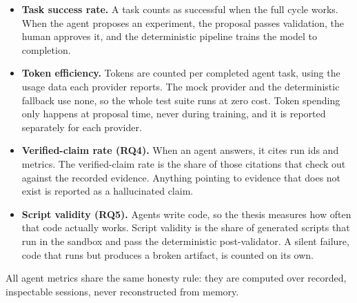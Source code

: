 \begin{itemize}
	\item \textbf{Task success rate.} A task counts as successful when the full cycle works. When the agent proposes an experiment, the proposal passes validation, the human approves it, and the deterministic pipeline trains the model to completion.
	\item \textbf{Token efficiency.} Tokens are counted per completed agent task, using the usage data each provider reports. The mock provider and the deterministic fallback use none, so the whole test suite runs at zero cost. Token spending only happens at proposal time, never during training, and it is reported separately for each provider.
	\item \textbf{Verified-claim rate (RQ4).} When an agent answers, it cites run ids and metrics. The verified-claim rate is the share of those citations that check out against the recorded evidence. Anything pointing to evidence that does not exist is reported as a hallucinated claim.
	\item \textbf{Script validity (RQ5).} Agents write code, so the thesis measures how often that code actually works. Script validity is the share of generated scripts that run in the sandbox and pass the deterministic post-validator. A silent failure, code that runs but produces a broken artifact, is counted on its own.
\end{itemize}

All agent metrics share the same honesty rule: they are computed over recorded, inspectable sessions, never reconstructed from memory.
